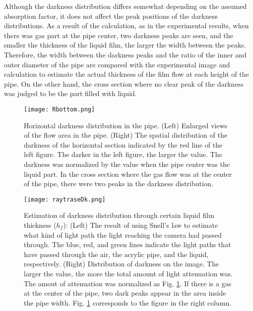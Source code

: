 \documentclass[aps,pre,preprint,groupedaddress,showkeys]{revtex4-2}
\begin{document}
Although the darkness distribution differs somewhat depending on the assumed absorption factor, it does not affect the peak positions of the darkness distributions.
As a result of the calculation, as in the experimental results, when there was gas part at the pipe center, two darkness peaks are seen, and the smaller the thickness of the liquid film, the larger the width between the peaks.
Therefore, the width between the darkness peaks and the ratio of the inner and outer diameter of the pipe are compared with the experimental image and calculation to estimate the actual thickness of the film flow at each height of the pipe.
On the other hand, the cross section where no clear peak of the darkness was judged to be the part filled with liquid.

\begin{figure}
\texttt{[image: Rbottom.png]} 
\caption{\label{Rbottom} Horizontal darkness distribution in the pipe.
(Left) Enlarged views of the flow area in the pipe.
(Right) The spatial distribution of the darkness of the horizontal section indicated by the red line of the left figure.
The darker in the left figure, the larger the value.
The darkness was normalized by the value when the pipe center was the liquid part.
In the cross section where the gas flow was at the center of the pipe, there were two peaks in the darkness distribution.}
\end{figure}

\begin{figure}
\texttt{[image: raytraseDk.png]} 
\caption{\label{raytraseDk}Estimation of darkness distribution through certain liquid film thickness ($ h_f $):
(Left) The result of using Snell's law to estimate what kind of light path the light reaching the camera had passed through.
The blue, red, and green lines indicate the light paths that have passed through the air, the acrylic pipe, and the liquid, respectively.
(Right) Distribution of darkness on the image.
The larger the value, the more the total amount of light attenuation was.
The amout of attenuation was normalized as Fig. \ref{Rbottom}.
If there is a gas at the center of the pipe, two dark peaks appear in the area inside the pipe width.
Fig. \ref{Rbottom} corresponds to the figure in the right column.}
\end{figure}
\end{document}
